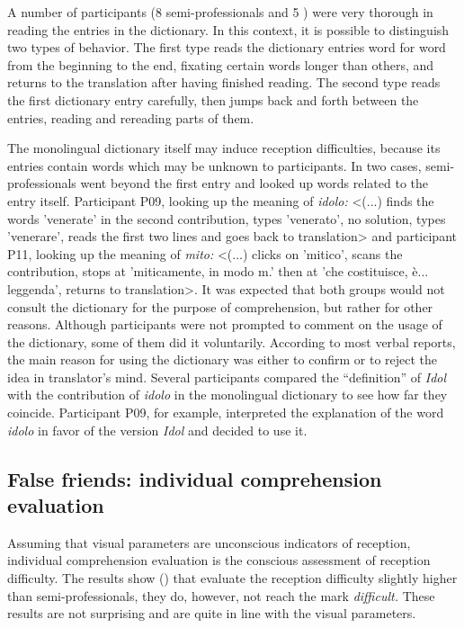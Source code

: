 \documentclass[output=paper]{langsci/langscibook.cls}
\begin{document}
A number of participants (8 semi-professionals and 5 ) were very thorough in reading the entries in the dictionary. In this context, it is possible to distinguish two types of behavior. The first type reads the dictionary entries word for word from the beginning to the end, fixating certain words longer than others, and returns to the translation after having finished reading. The second type reads the first dictionary entry carefully, then jumps back and forth between the entries, reading and rereading parts of them. 

\newpage 
The monolingual dictionary itself may induce reception difficulties, because its entries contain words which may be unknown to participants. In two cases, semi-professionals went beyond the first entry and looked up words related to the entry itself. Participant P09, looking up the meaning of \textit{idolo:} \textsf{<(...) finds the words 'venerate' in the second contribution, types 'venerato', no solution, types 'venerare', reads the first two lines and goes back to translation>} and participant P11, looking up the meaning of \textit{mito:} \textsf{<(...) clicks on 'mitico', scans the contribution, stops at 'miticamente, in modo m.' then at 'che costituisce,} \textsf{è...} \textsf{leggenda', returns to translation>.} It was expected that both groups would not consult the dictionary for the purpose of comprehension, but rather for other reasons. Although participants were not prompted to comment on the usage of the dictionary, some of them did it voluntarily. According to most verbal reports, the main reason for using the dictionary was either to confirm or to reject the idea in translator's mind. Several participants compared the  ``definition'' of \textit{Idol} with the contribution of \textit{idolo} in the monolingual dictionary to see how far they coincide. Participant P09, for example, interpreted the explanation of the word \textit{idolo} in favor of the  version \textit{Idol} and decided to use it. 

\subsection{False friends: individual comprehension evaluation} 
Assuming that visual parameters are unconscious indicators of reception, individual comprehension evaluation is the conscious assessment of reception difficulty. The results show () that  evaluate the reception difficulty slightly higher than semi-professionals, they do, however, not reach the mark \textit{difficult.} These results are not surprising and are quite in line with the visual parameters. 
\end{document}
